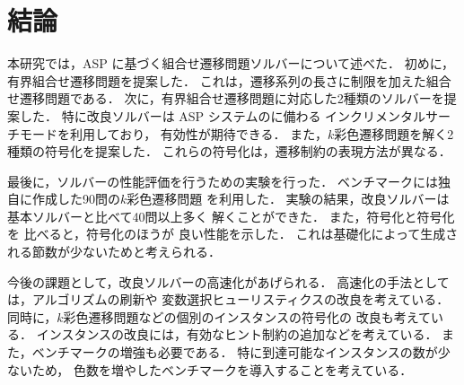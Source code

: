 \section{結論} \label{chap:conclusion}
本研究では，ASP に基づく組合せ遷移問題ソルバーについて述べた．
初めに，有界組合せ遷移問題を提案した．
これは，遷移系列の長さに制限を加えた組合せ遷移問題である．
次に，有界組合せ遷移問題に対応した2種類のソルバーを提案した．
特に改良ソルバーは ASP システムの{\clingo}に備わる
インクリメンタルサーチモードを利用しており，
有効性が期待できる．
また，$k$彩色遷移問題を解く2種類の符号化を提案した．
これらの符号化は，遷移制約の表現方法が異なる．

最後に，ソルバーの性能評価を行うための実験を行った．
ベンチマークには独自に作成した90問の$k$彩色遷移問題
を利用した．
実験の結果，改良ソルバーは基本ソルバーと比べて40問以上多く
解くことができた．
また，符号化と符号化を
比べると，符号化のほうが
良い性能を示した．
これは基礎化によって生成される節数が少ないためと考えられる．

今後の課題として，改良ソルバーの高速化があげられる．
高速化の手法としては，アルゴリズムの刷新や
変数選択ヒューリスティクスの改良を考えている．
同時に，$k$彩色遷移問題などの個別のインスタンスの符号化の
改良も考えている．
インスタンスの改良には，有効なヒント制約の追加などを考えている．
また，ベンチマークの増強も必要である．
特に到達可能なインスタンスの数が少ないため，
色数を増やしたベンチマークを導入することを考えている．